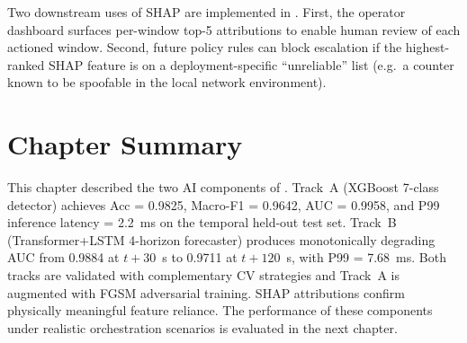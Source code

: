 Two downstream uses of SHAP are implemented in \padonap{}. First, the
operator dashboard surfaces per-window top-5 attributions to enable human
review of each actioned window. Second, future policy rules can block
escalation if the highest-ranked SHAP feature is on a deployment-specific
``unreliable'' list (e.g.~a counter known to be spoofable in the local
network environment).

\section{Chapter Summary}
\label{sec:ai-summary}

This chapter described the two AI components of \padonap{}. Track~A
(XGBoost 7-class detector) achieves Acc = 0.9825, Macro-F1 = 0.9642,
AUC = 0.9958, and P99 inference latency = 2.2~ms on the temporal
held-out test set. Track~B (Transformer+LSTM 4-horizon forecaster)
produces monotonically degrading AUC from 0.9884 at $t{+}30$~s to
0.9711 at $t{+}120$~s, with P99 = 7.68~ms. Both tracks are validated
with complementary CV strategies and Track~A is augmented with FGSM
adversarial training. SHAP attributions confirm physically meaningful
feature reliance. The performance of these components under realistic
orchestration scenarios is evaluated in the next chapter.
